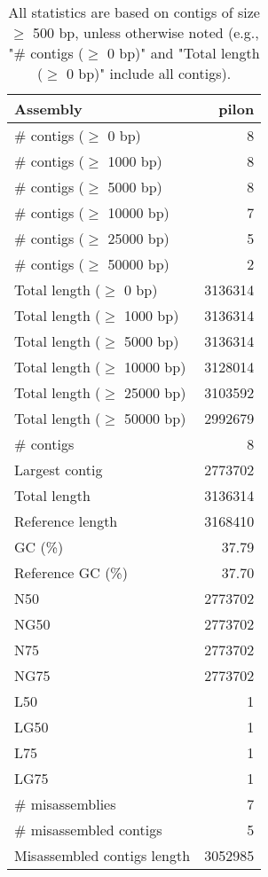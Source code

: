 \documentclass[12pt,a4paper]{article}
\begin{document}
\begin{table}[ht]
\begin{center}
\caption{All statistics are based on contigs of size $\geq$ 500 bp, unless otherwise noted (e.g., "\# contigs ($\geq$ 0 bp)" and "Total length ($\geq$ 0 bp)" include all contigs).}
\begin{tabular}{|l*{1}{|r}|}
\hline
Assembly & pilon \\ \hline
\# contigs ($\geq$ 0 bp) & 8 \\ \hline
\# contigs ($\geq$ 1000 bp) & 8 \\ \hline
\# contigs ($\geq$ 5000 bp) & 8 \\ \hline
\# contigs ($\geq$ 10000 bp) & 7 \\ \hline
\# contigs ($\geq$ 25000 bp) & 5 \\ \hline
\# contigs ($\geq$ 50000 bp) & 2 \\ \hline
Total length ($\geq$ 0 bp) & 3136314 \\ \hline
Total length ($\geq$ 1000 bp) & 3136314 \\ \hline
Total length ($\geq$ 5000 bp) & 3136314 \\ \hline
Total length ($\geq$ 10000 bp) & 3128014 \\ \hline
Total length ($\geq$ 25000 bp) & 3103592 \\ \hline
Total length ($\geq$ 50000 bp) & 2992679 \\ \hline
\# contigs & 8 \\ \hline
Largest contig & 2773702 \\ \hline
Total length & 3136314 \\ \hline
Reference length & 3168410 \\ \hline
GC (\%) & 37.79 \\ \hline
Reference GC (\%) & 37.70 \\ \hline
N50 & 2773702 \\ \hline
NG50 & 2773702 \\ \hline
N75 & 2773702 \\ \hline
NG75 & 2773702 \\ \hline
L50 & 1 \\ \hline
LG50 & 1 \\ \hline
L75 & 1 \\ \hline
LG75 & 1 \\ \hline
\# misassemblies & 7 \\ \hline
\# misassembled contigs & 5 \\ \hline
Misassembled contigs length & 3052985 \\ \hline

\end{tabular}
\end{center}
\end{table}
\end{document}
